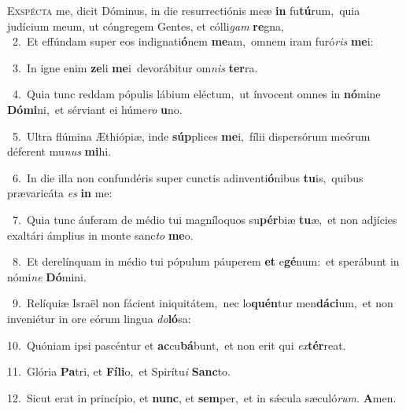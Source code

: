 \lettrine{\initial\textcolor{\initialcolor}{E}}{xspécta} me, dicit Dóminus, in die resurrectiónis meæ \textbf{in} fu\-\textbf{tú}\-rum,~\star quia judícium meum, ut cóngregem Gentes, et cólli\textit{gam} \textbf{re}\-gna,\\
{\numbfont\textcolor{\numbcolor}{~2.}}~Et effúndam super eos indignati\-\textbf{ó}\-nem \textbf{me}\-am,~\star omnem iram furó\textit{ris} \textbf{me}\-i:\par
{\numbfont\textcolor{\numbcolor}{~3.}}~In igne enim \textbf{ze}\-li \textbf{me}\-i~\star devorábitur om\textit{nis} \textbf{ter}\-ra.\par
{\numbfont\textcolor{\numbcolor}{~4.}}~Quia tunc reddam pópulis lábium eléctum,~\dagger ut ínvocent omnes in \textbf{nó}\-mine \textbf{Dó}\-\textbf{mi}ni,~\star et sérviant ei húme\textit{ro} \textbf{u}\-no.\par
{\numbfont\textcolor{\numbcolor}{~5.}}~Ultra flúmina Æthiópiæ, inde \textbf{súp}\-plices \textbf{me}\-i,~\star fílii dispersórum meórum déferent mu\textit{nus} \textbf{mi}\-hi.\par
{\numbfont\textcolor{\numbcolor}{~6.}}~In die illa non confundéris super cunctis adinventi\-\textbf{ó}\-nibus \textbf{tu}\-is,~\star quibus prævaricáta \textit{es} \textbf{in} me:\par
{\numbfont\textcolor{\numbcolor}{~7.}}~Quia tunc áuferam de médio tui magníloquos su\-\textbf{pér}\-biæ \textbf{tu}\-æ,~\star et non adjícies exaltári ámplius in monte sanc\textit{to} \textbf{me}\-o.\par
{\numbfont\textcolor{\numbcolor}{~8.}}~Et derelínquam in médio tui pópulum páuperem \textbf{et} e\-\textbf{gé}\-num:~\star et sperábunt in nómi\textit{ne} \textbf{Dó}\-mini.\par
{\numbfont\textcolor{\numbcolor}{~9.}}~Relíquiæ Israël non fácient iniquitátem,~\dagger nec lo\-\textbf{quén}\-tur men\-\textbf{dá}\-\textbf{ci}um,~\star et non inveniétur in ore eórum lingua \textit{do}\-\textbf{ló}sa:\par
{\numbfont\textcolor{\numbcolor}{10.}}~Quóniam ipsi pascéntur et \textbf{ac}\-cu\-\textbf{bá}\-bunt,~\star et non erit qui \textit{ex}\-\textbf{tér}reat.\par
{\numbfont\textcolor{\numbcolor}{11.}}~Glória \textbf{Pa}\-tri, et \textbf{Fí}\-\textbf{li}o,~\star et Spirítu\textit{i} \textbf{Sanc}\-to.\par
{\numbfont\textcolor{\numbcolor}{12.}}~Sicut erat in princípio, et \textbf{nunc}\-, et \textbf{sem}\-per,~\star et in sǽcula sæculó\-\textit{rum}\-. \textbf{A}\-men.\par
